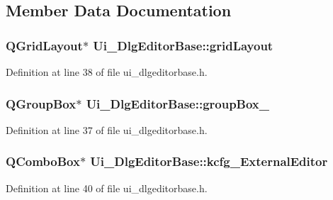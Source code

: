 \subsection{Member Data Documentation}
\hypertarget{classUi__DlgEditorBase_a00e2ad664672aefcb22d0f5db12ead6e}{
\subsubsection[{grid\+Layout}]{\setlength{\rightskip}{0pt plus 5cm}Q\+Grid\+Layout$\ast$ Ui\+\_\+\+Dlg\+Editor\+Base\+::grid\+Layout}}\label{classUi__DlgEditorBase_a00e2ad664672aefcb22d0f5db12ead6e}


Definition at line 38 of file ui\+\_\+dlgeditorbase.\+h.

\hypertarget{classUi__DlgEditorBase_ac29bd679e8fa10b5cc21c9db0015ef32}{
\subsubsection[{group\+Box\+\_\+2}]{\setlength{\rightskip}{0pt plus 5cm}Q\+Group\+Box$\ast$ Ui\+\_\+\+Dlg\+Editor\+Base\+::group\+Box\+\_}}\label{classUi__DlgEditorBase_ac29bd679e8fa10b5cc21c9db0015ef32}


Definition at line 37 of file ui\+\_\+dlgeditorbase.\+h.

\hypertarget{classUi__DlgEditorBase_aea3d3090a97b8e3074b1e571713a9510}{
\subsubsection[{kcfg\+\_\+\+External\+Editor}]{\setlength{\rightskip}{0pt plus 5cm}Q\+Combo\+Box$\ast$ Ui\+\_\+\+Dlg\+Editor\+Base\+::kcfg\+\_\+\+External\+Editor}}\label{classUi__DlgEditorBase_aea3d3090a97b8e3074b1e571713a9510}


Definition at line 40 of file ui\+\_\+dlgeditorbase.\+h.

